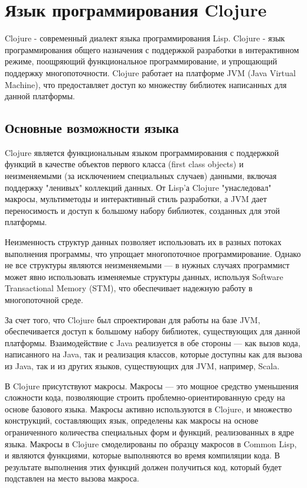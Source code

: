 \section{Язык программирования Clojure}

Clojure \cite{clojure} - современный диалект языка программирования Lisp. Clojure - язык программирования общего назначения с поддержкой разработки в интерактивном режиме, поощряющий функциональное программирование, и упрощающий поддержку многопоточности. Clojure работает на платформе JVM (Java Virtual Machine), что предоставляет доступ ко множеству библиотек написанных для данной платформы.

\subsection{Основные возможности языка}

Clojure является функциональным языком программирования с поддержкой функций в качестве объектов первого класса (first class objects) и неизменяемыми (за исключением специальных случаев) данными, включая поддержку "ленивых" коллекций данных. От Lisp'а Clojure "унаследовал" макросы, мультиметоды и интерактивный стиль разработки, а JVM дает переносимость и доступ к большому набору библиотек, созданных для этой платформы.

Неизменность структур данных позволяет использовать их в разных потоках выполнения программы, что упрощает многопоточное программирование. Однако не все структуры являются неизменяемыми — в нужных случаях программист может явно использовать изменяемые структуры данных, используя Software Transactional Memory (STM), что обеспечивает надежную работу в многопоточной среде.

За счет того, что Clojure был спроектирован для работы на базе JVM, обеспечивается доступ к большому набору библиотек, существующих для данной платформы. Взаимодействие с Java реализуется в обе стороны — как вызов кода, написанного на Java, так и реализация классов, которые доступны как для вызова из Java, так и из других языков, существующих для JVM, например, Scala.

В Clojure присутствуют макросы. Макросы — это мощное средство уменьшения сложности кода, позволяющие строить проблемно-ориентированную среду на основе базового языка. Макросы активно используются в Clojure, и множество конструкций, составляющих язык, определены как макросы на основе ограниченного количества специальных форм и функций, реализованных в ядре языка. Макросы в Clojure смоделированы по образцу макросов в Common Lisp, и являются функциями, которые выполняются во время компиляции кода. В результате выполнения этих функций должен получиться код, который будет подставлен на место вызова макроса.

